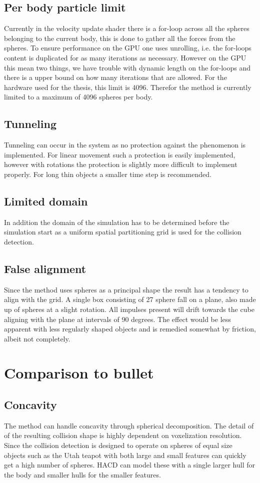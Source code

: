 \subsection{Per body particle limit}
Currently in the velocity update shader there is a for-loop across all the spheres
belonging to the current body, this is done to gather all the forces from the spheres.
To ensure performance on the GPU one uses unrolling, i.e. the for-loops content is
duplicated for as many iterations as necessary. However on the GPU this mean two
things, we have trouble with dynamic length on the for-loops and there is a upper
bound on how many iterations that are allowed. For the hardware used for the thesis,
this limit is 4096. Therefor the method is currently limited to a maximum of 4096
spheres per body.

\subsection{Tunneling}
Tunneling can occur in the system as no protection against the phenomenon is implemented.
For linear movement such a protection is easily implemented, however with rotations
the protection is slightly more difficult to implement properly. For long thin
objects a smaller time step is recommended.
\subsection{Limited domain}
In addition the domain of the simulation has to be determined before the simulation start
as a uniform spatial partitioning grid is used for the collision detection.

\subsection{False alignment}
Since the method uses spheres as a principal shape the result has a tendency to align
with the grid. A single box consisting of 27 sphere fall on a plane, also made up of spheres
at a slight rotation. All impulses present will drift towards the cube aligning with the
plane at intervals of 90 degrees. The effect would be less apparent with less regularly shaped objects and
is remedied somewhat by friction, albeit not completely.

\section{Comparison to bullet}
\subsection{Concavity}
The method can handle concavity through spherical decomposition. The detail of of
the resulting collision shape is highly dependent on voxelization resolution.
Since the collision detection is designed to operate on spheres of equal size
objects such as the Utah teapot with both large and small features can quickly get
a high number of spheres. HACD can model these with a single larger hull for the body
and smaller hulls for the smaller features.

